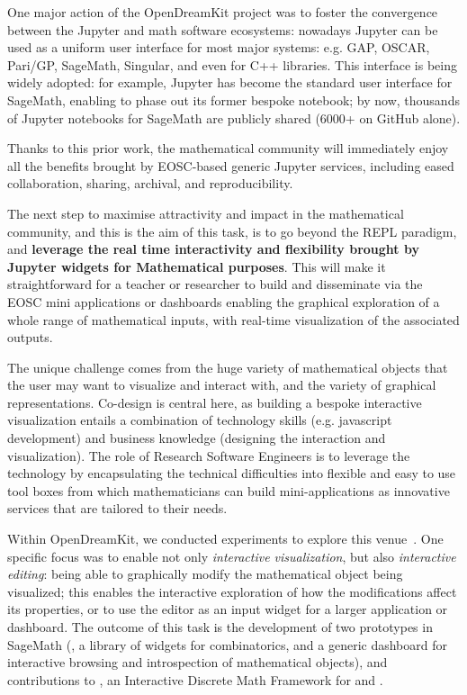   One major action of the OpenDreamKit project was to foster the
  convergence between the Jupyter and math software ecosystems:
  nowadays Jupyter can be used as a uniform user interface for most
  major systems: e.g. GAP, OSCAR, Pari/GP, SageMath, Singular, and
  even for C++ libraries. This interface is being widely adopted: for
  example, Jupyter has become the standard user interface for
  SageMath, enabling to phase out its former bespoke notebook; by now,
  thousands of Jupyter notebooks for SageMath are publicly shared
  (6000+ on GitHub alone).

  Thanks to this prior work, the mathematical community will
  immediately enjoy all the benefits brought by EOSC-based generic
  Jupyter services, including eased collaboration, sharing, archival,
  and reproducibility.

  The next step to maximise attractivity and impact in the
  mathematical community, and this is the aim of this task, is to go
  beyond the REPL paradigm, and \textbf{leverage the real time
    interactivity and flexibility brought by Jupyter widgets for
    Mathematical purposes}. This will make it straightforward for a teacher or
  researcher to build and disseminate via the EOSC mini applications
  or dashboards enabling the graphical exploration of a whole range of
  mathematical inputs, with real-time visualization of the associated
  outputs.

  The unique challenge comes from the huge variety of mathematical
  objects that the user may want to visualize and interact with, and
  the variety of graphical representations. Co-design is central here,
  as building a bespoke interactive visualization entails a
  combination of technology skills (e.g. javascript development) and
  business knowledge (designing the interaction and visualization).
  The role of Research Software Engineers is to leverage the
  technology by encapsulating the technical difficulties into flexible
  and easy to use tool boxes from which mathematicians can build
  mini-applications as innovative services that are tailored to their needs.

  Within OpenDreamKit, we conducted experiments to explore this
  venue~\cite{ODK_D4.16}. One specific focus was to enable not only
  \emph{interactive visualization}, but also \emph{interactive
    editing}: being able to graphically modify the mathematical object
  being visualized; this enables the interactive exploration of how the
  modifications affect its properties, or to use the editor as an input
  widget for a larger application or dashboard. The outcome of this
  task is the development of two prototypes in SageMath
  (, a library of widgets for
  combinatorics, and  a generic dashboard for
  interactive browsing and introspection of mathematical objects), and
  contributions to , an Interactive Discrete Math
  Framework for  and .

